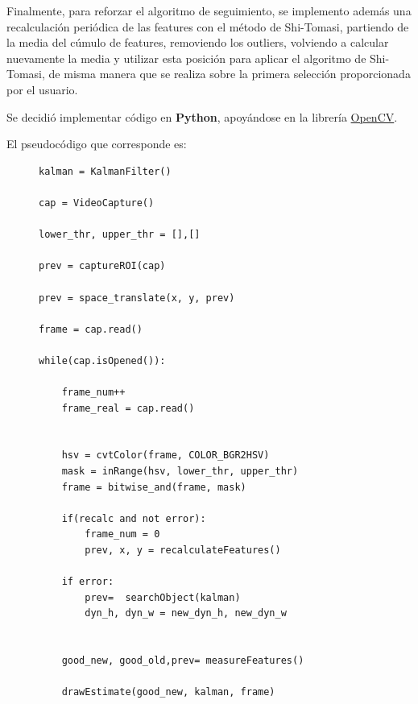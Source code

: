 Finalmente, para reforzar el algoritmo de seguimiento, se implemento además una recalculación periódica de las features con el método de Shi-Tomasi, partiendo de la media del cúmulo de features, removiendo los outliers, volviendo a calcular nuevamente la media y utilizar esta posición para aplicar el algoritmo de Shi-Tomasi, de misma manera que se realiza sobre la primera selección proporcionada por el usuario.



Se decidió implementar código en \textbf{Python}, apoyándose en la librería \href{https://opencv.org/}{OpenCV}.



El pseudocódigo que corresponde es:


 
\begin{figure}[H]

\begin{lstlisting}
kalman = KalmanFilter()

cap = VideoCapture()

lower_thr, upper_thr = [],[]

prev = captureROI(cap)

prev = space_translate(x, y, prev)

frame = cap.read()

while(cap.isOpened()):

    frame_num++
    frame_real = cap.read()


    hsv = cvtColor(frame, COLOR_BGR2HSV)
    mask = inRange(hsv, lower_thr, upper_thr)
    frame = bitwise_and(frame, mask)

    if(recalc and not error):
        frame_num = 0
        prev, x, y = recalculateFeatures()

    if error:
        prev=  searchObject(kalman)
        dyn_h, dyn_w = new_dyn_h, new_dyn_w


    good_new, good_old,prev= measureFeatures()

    drawEstimate(good_new, kalman, frame)

\end{lstlisting}
\end{figure} 
 
